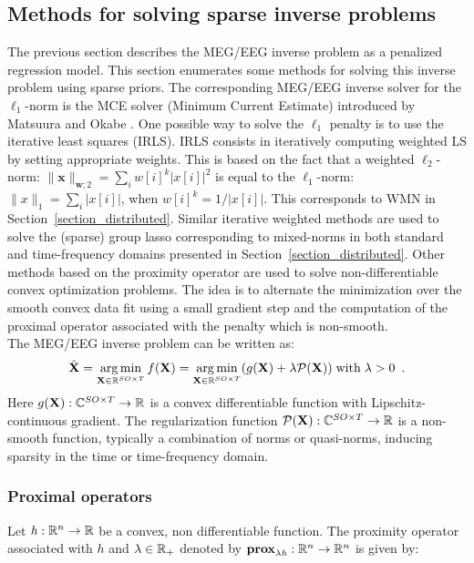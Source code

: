 \subsection{Methods for solving sparse inverse problems}
The previous section describes the MEG/EEG inverse problem as a penalized regression model. This section enumerates some methods for solving this inverse problem using sparse priors. The corresponding MEG/EEG inverse solver for the $\ell_1$-norm is the MCE solver (Minimum Current Estimate) introduced by Matsuura and Okabe \cite{matsuura1995selective}. One possible way to solve the $\ell_1$ penalty is to use the iterative least squares (IRLS). IRLS consists in iteratively computing weighted LS by setting appropriate weights. This is based on the fact that a weighted $\ell_2$-norm: $\|\mathbf{x}\|_{\mathbf{w};2}=\sum_i w[i]^k |x[i]|^2$ is equal to the $\ell_1$-norm: $\|x\|_1=\sum_i|x[i]|$, when $w[i]^k=1/|x[i]|$. This corresponds to WMN in Section~\ref{section_distributed}. Similar iterative weighted methods are used to solve the (sparse) group lasso corresponding to mixed-norms in both standard and time-frequency domains presented in Section~\ref{section_distributed}. Other methods based on the proximity operator are used to solve non-differentiable convex optimization problems. The idea is to alternate the minimization over the smooth convex data fit using a small gradient step and the computation of the proximal operator associated with the penalty which is non-smooth.\\

The MEG/EEG inverse problem can be written as:
\begin{equation}
\hat{\mathbf{X}} = \mathop{\mathrm{arg}\,\mathrm{min}}_{\mathbf{X}\in\mathbb{R}^{SO\times T}}f(\mathbf{X}) = \mathop{\mathrm{arg}\,\mathrm{min}}_{\mathbf{X}\in\mathbb{R}^{SO\times T}}(g(\mathbf{X}) + \lambda\mathcal{P}(\mathbf{X})) \mathrm{\;with\;} \lambda>0 \enspace .
\end{equation}
Here $g(\mathbf{X}):\mathbb{C}^{SO\times T}\rightarrow\mathbb{R}$ is a convex differentiable function with Lipschitz-continuous gradient. The regularization function $\mathcal{P}(\mathbf{X}):\mathbb{C}^{SO\times T}\rightarrow\mathbb{R}$ is a non-smooth function, typically a combination of norms or quasi-norms, inducing sparsity in the time or time-frequency domain.

\subsubsection*{Proximal operators}
Let $\mathit{h}:\mathbb{R}^n\rightarrow\mathbb{R}$ be a convex, non differentiable function. The proximity operator associated with $\mathit{h}$ and $\lambda\in\mathbb{R}_+$ denoted by
$\textbf{prox}_{\lambda\mathit{h}}:\mathbb{R}^n\rightarrow\mathbb{R}^n$ is given by:

